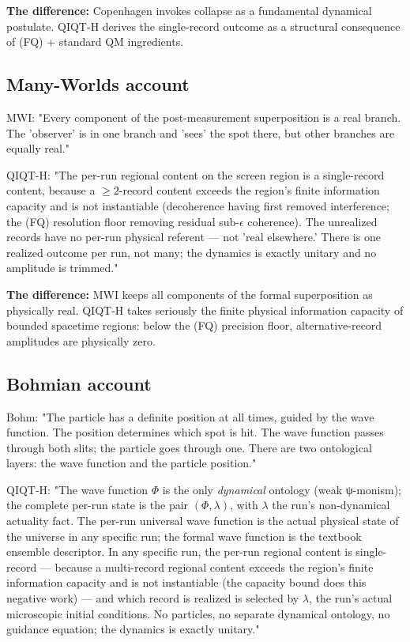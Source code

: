 \documentclass[11pt,a4paper]{article}
\begin{document}
\textbf{The difference:} Copenhagen invokes collapse as a fundamental dynamical postulate. QIQT-H derives the single-record outcome as a structural consequence of (FQ) + standard QM ingredients.

\subsection{Many-Worlds account}

MWI: "Every component of the post-measurement superposition is a real branch. The 'observer' is in one branch and 'sees' the spot there, but other branches are equally real."

QIQT-H: "The per-run regional content on the screen region is a single-record content, because a $\ge 2$-record content exceeds the region's finite information capacity and is not instantiable (decoherence having first removed interference; the (FQ) resolution floor removing residual sub-$\epsilon$ coherence). The unrealized records have no per-run physical referent — not 'real elsewhere.' There is one realized outcome per run, not many; the dynamics is exactly unitary and no amplitude is trimmed."

\textbf{The difference:} MWI keeps all components of the formal superposition as physically real. QIQT-H takes seriously the finite physical information capacity of bounded spacetime regions: below the (FQ) precision floor, alternative-record amplitudes are physically zero.

\subsection{Bohmian account}

Bohm: "The particle has a definite position at all times, guided by the wave function. The position determines which spot is hit. The wave function passes through both slits; the particle goes through one. There are two ontological layers: the wave function and the particle position."

QIQT-H: "The wave function $\Phi$ is the only \emph{dynamical} ontology (weak ψ-monism); the complete per-run state is the pair $(\Phi, \lambda)$, with $\lambda$ the run's non-dynamical actuality fact. The per-run universal wave function is the actual physical state of the universe in any specific run; the formal wave function is the textbook ensemble descriptor. In any specific run, the per-run regional content is single-record — because a multi-record regional content exceeds the region's finite information capacity and is not instantiable (the capacity bound does this negative work) — and which record is realized is selected by $\lambda$, the run's actual microscopic initial conditions. No particles, no separate dynamical ontology, no guidance equation; the dynamics is exactly unitary."
\end{document}
